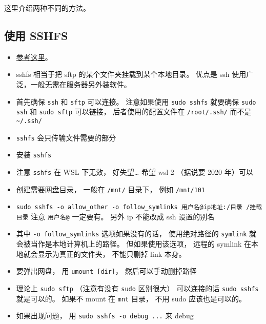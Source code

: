 
这里介绍两种不同的方法。

\subsection{使用 SSHFS}
\begin{itemize}
\item \href{https://www.digitalocean.com/community/tutorials/how-to-use-sshfs-to-mount-remote-file-systems-over-ssh}{参考这里}。
\item sshfs 相当于把 sftp 的某个文件夹挂载到某个本地目录。 优点是 ssh 使用广泛，一般无需在服务器另外装软件。
\item 首先确保 \verb`ssh` 和 \verb|sftp| 可以连接。 注意如果使用 \verb|sudo sshfs| 就要确保 \verb|sudo ssh| 和 \verb|sudo sftp| 可以链接， 后者使用的配置文件在 \verb|/root/.ssh/| 而不是 \verb|~/.ssh/|
\item \verb|sshfs| 会只传输文件需要的部分 %
\item 安装 \verb`sshfs`
\item 注意 \verb`sshfs` 在 WSL 下无效， 好失望… 希望 wsl 2 （据说要 2020 年）可以
\item 创建需要网盘目录， 一般在 \verb`/mnt/` 目录下， 例如 \verb`/mnt/101`
\item \verb`sudo sshfs -o allow_other -o follow_symlinks 用户名@ip地址:/目录 /挂载目录` 注意 \verb`用户名@` 一定要有。 另外 ip 不能改成 ssh 设置的别名
\item 其中 \verb|-o follow_symlinks| 选项如果没有的话， 使用绝对路径的 \verb|symlink| 就会被当作是本地计算机上的路径。 但如果使用该选项， 远程的 symlink 在本地就会显示为真正的文件夹， 不能只删掉 link 本身。
\item 要弹出网盘， 用 \verb`umount [dir]`， 然后可以手动删掉路径
\item 理论上 \verb|sudo sftp| （注意有没有 \verb|sudo| 区别很大） 可以连接的话 \verb|sudo sshfs| 就是可以的。 如果不 mount 在 \verb|mnt| 目录， 不用 sudo 应该也是可以的。
\item 如果出现问题， 用 \verb|sudo sshfs -o debug ...| 来 debug
\end{itemize}

